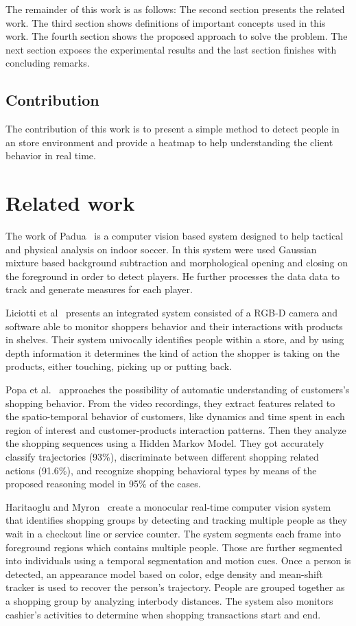 \documentclass[10pt, conference]{IEEEtran}
\begin{document}
	The remainder of this work is as follows: The second section presents the related work. The third section shows definitions of important concepts used in this work. The fourth section shows the proposed approach to solve the problem. The next section exposes the experimental results and the last section finishes with concluding remarks.
	
	\subsection{Contribution}
	The contribution of this work is to present a simple method to detect people in an store environment and provide a heatmap to help understanding the client behavior in real time.
	
	\section{Related work}
	The work of Padua~\cite{padua2014sistema} is a computer vision based system designed to help tactical and physical analysis on indoor soccer. In this system were used Gaussian mixture based background subtraction\cite{zivkovic2004improved} and morphological opening and closing\cite{haralick1987image} on the foreground in order to detect players. He further processes the data data to track and generate measures for each player.
	
	Liciotti et al~\cite{liciotti2014shopper} presents an integrated system consisted of a RGB-D camera and software able to monitor shoppers behavior and their interactions with products in shelves. Their system univocally identifies people within a store, and by using depth information it determines the kind of action the shopper is taking on the products, either touching, picking up or putting back.
	
	Popa et al.~\cite{popa2013semantic} approaches the possibility of automatic understanding of customers’s shopping behavior. From the video recordings, they extract features related to the spatio-temporal behavior of customers, like dynamics and time spent in each region of interest and customer-products interaction patterns. Then they analyze the shopping sequences using a Hidden Markov Model. They got accurately classify trajectories (93\%), discriminate between different shopping related actions (91.6\%), and recognize shopping behavioral types by means of the proposed reasoning model in 95\% of the cases.
	
	Haritaoglu and Myron~\cite{haritaoglu2001detection} create a monocular real-time computer vision system that identifies shopping groups by detecting and tracking multiple people as they wait in a checkout line or service counter. The system segments each frame into foreground regions which contains multiple people. Those are further segmented into individuals using a temporal segmentation and motion cues. Once a person is detected, an appearance model based on color, edge density and mean-shift tracker is used to recover the person’s trajectory. People are grouped together as a shopping group by analyzing interbody distances. The system also monitors cashier’s activities to determine when shopping transactions start and end.
	
\end{document}

